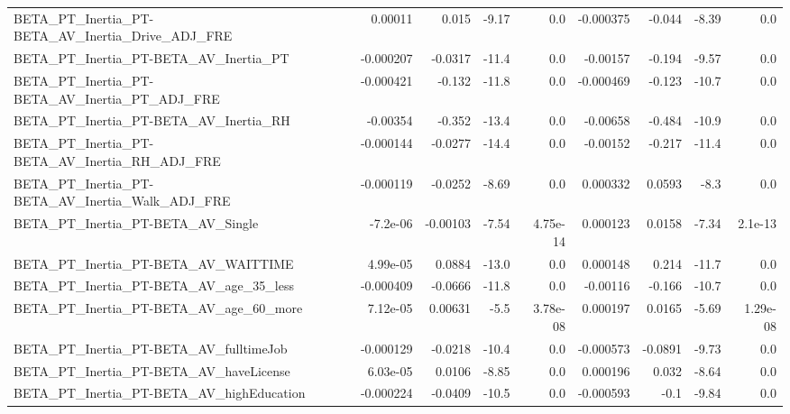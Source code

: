 \begin{tabular}{lrrrrrrrr}
BETA\_PT\_Inertia\_PT-BETA\_AV\_Inertia\_Drive\_ADJ\_FRE   &     0.00011 &        0.015 &    -9.17 &      0.0 &  -0.000375 &      -0.044 &        -8.39 &           0.0 \\
BETA\_PT\_Inertia\_PT-BETA\_AV\_Inertia\_PT              &   -0.000207 &      -0.0317 &    -11.4 &      0.0 &   -0.00157 &      -0.194 &        -9.57 &           0.0 \\
BETA\_PT\_Inertia\_PT-BETA\_AV\_Inertia\_PT\_ADJ\_FRE      &   -0.000421 &       -0.132 &    -11.8 &      0.0 &  -0.000469 &      -0.123 &        -10.7 &           0.0 \\
BETA\_PT\_Inertia\_PT-BETA\_AV\_Inertia\_RH              &    -0.00354 &       -0.352 &    -13.4 &      0.0 &   -0.00658 &      -0.484 &        -10.9 &           0.0 \\
BETA\_PT\_Inertia\_PT-BETA\_AV\_Inertia\_RH\_ADJ\_FRE      &   -0.000144 &      -0.0277 &    -14.4 &      0.0 &   -0.00152 &      -0.217 &        -11.4 &           0.0 \\
BETA\_PT\_Inertia\_PT-BETA\_AV\_Inertia\_Walk\_ADJ\_FRE    &   -0.000119 &      -0.0252 &    -8.69 &      0.0 &   0.000332 &      0.0593 &         -8.3 &           0.0 \\
BETA\_PT\_Inertia\_PT-BETA\_AV\_Single                  &    -7.2e-06 &     -0.00103 &    -7.54 & 4.75e-14 &   0.000123 &      0.0158 &        -7.34 &       2.1e-13 \\
BETA\_PT\_Inertia\_PT-BETA\_AV\_WAITTIME                &    4.99e-05 &       0.0884 &    -13.0 &      0.0 &   0.000148 &       0.214 &        -11.7 &           0.0 \\
BETA\_PT\_Inertia\_PT-BETA\_AV\_age\_35\_less             &   -0.000409 &      -0.0666 &    -11.8 &      0.0 &   -0.00116 &      -0.166 &        -10.7 &           0.0 \\
BETA\_PT\_Inertia\_PT-BETA\_AV\_age\_60\_more             &    7.12e-05 &      0.00631 &     -5.5 & 3.78e-08 &   0.000197 &      0.0165 &        -5.69 &      1.29e-08 \\
BETA\_PT\_Inertia\_PT-BETA\_AV\_fulltimeJob             &   -0.000129 &      -0.0218 &    -10.4 &      0.0 &  -0.000573 &     -0.0891 &        -9.73 &           0.0 \\
BETA\_PT\_Inertia\_PT-BETA\_AV\_haveLicense             &    6.03e-05 &       0.0106 &    -8.85 &      0.0 &   0.000196 &       0.032 &        -8.64 &           0.0 \\
BETA\_PT\_Inertia\_PT-BETA\_AV\_highEducation           &   -0.000224 &      -0.0409 &    -10.5 &      0.0 &  -0.000593 &        -0.1 &        -9.84 &           0.0 \\

\end{tabular}
